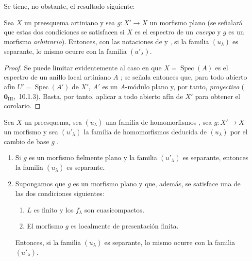Se tiene, no obstante, el resultado siguiente:

\begin{corollary}[11.9.9]
\label{IV.11.9.9}
Sea $X$ un preesquema \textup{artiniano} y sea $g:X'\to X$ un morfismo \textup{plano (se señalará que estas dos condiciones se satisfacen si $X$ es el espectro de un \emph{cuerpo} y $g$ es un morfismo \emph{arbitrario})}.
Entonces, con las notaciones de  y , si la familia $(u_\lambda)$ es separante, lo mismo ocurre con la familia $(u'_\lambda)$.
\end{corollary}

\begin{proof}
Se puede limitar evidentemente al caso en que $X=\operatorname{Spec}(A)$ es el espectro de un anillo local artiniano $A$ ; se señala entonces que, para todo abierto afín $U'=\operatorname{Spec}(A')$ de $X'$, $A'$ es un $A$-módulo plano y, por tanto, \emph{proyectivo} ($\mathbf{0}_{\mathrm{III}}$,~10.1.3).
Basta, por tanto, aplicar  a todo abierto afín de $X'$ para obtener el corolario.
\end{proof}

\begin{theorem}[11.9.10]
\label{IV.11.9.10}
Sea $X$ un preesquema, sea $(u_\lambda)$ una familia de homomorfismos , sea $g:X'\to X$ un morfismo y sea $(u'_\lambda)$ la familia de homomorfismos deducida de $(u_\lambda)$ por el cambio de base $g$ .
\begin{enumerate}[label=\textup{(\roman*)}]
  \item Si $g$ es un morfismo fielmente plano y la familia $(u'_\lambda)$ es separante, entonces la familia $(u_\lambda)$ es separante.
  


\item Supongamos que $g$ es un morfismo plano y que, además, se satisface \textup{una} de las dos condiciones siguientes:
  \begin{enumerate}[label=\emph{\alph*)}]
    \item $L$ es finito y los $f_\lambda$ son cuasicompactos.
    \item El morfismo $g$ es localmente de presentación finita.
  \end{enumerate}
  Entonces, si la familia $(u_\lambda)$ es separante, lo mismo ocurre con la familia $(u'_\lambda)$.
\end{enumerate}
\end{theorem}

